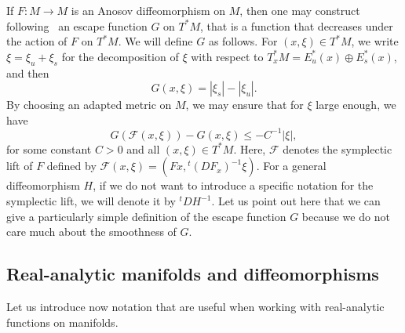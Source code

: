 \documentclass[10pt]{amsart}
\theoremstyle{definition}\newtheorem{defi}[theo]{Definition}\newtheorem{rema}[theo]{Remark}\newtheorem{exam}[theo]{Example}\newtheorem{exem}[theo]{Example}\newtheorem{nota}[theo]{Notation}
\newcommand{\va}[1]{\left|#1\right|}
\newcommand{\clF}{\mathcal{F}}
\begin{document}
If $F : M \to M$ is an Anosov diffeomorphism on $M$, then one may construct following~\cite{faure_roy_sjostrand} an escape function $G$ on $T^* M$, that is a function that decreases under the action of $F$ on $T^* M$. We will define $G$ as follows. For $(x,\xi) \in T^* M$, we write $\xi = \xi_u + \xi_s$ for the decomposition of $\xi$ with respect to $T^*_x M = E_u^*(x) \oplus E_s^*(x)$, and then
\begin{equation}\label{eq:definition_escape_function}
G(x,\xi) = \va{\xi_s} - \va{\xi_u}.
\end{equation}
By choosing an adapted metric on $M$, we may ensure that for $\xi$ large enough, we have
\begin{equation*}
G(\clF(x,\xi)) - G(x,\xi) \leq - C^{-1} \va{\xi},
\end{equation*}
for some constant $C > 0$ and all $(x,\xi) \in T^* M$. Here, $\clF$ denotes the symplectic lift of $F$ defined by $\clF(x,\xi) = (Fx, {}^t (DF_x)^{-1} \xi)$. For a general diffeomorphism $H$, if we do not want to introduce a specific notation for the symplectic lift, we will denote it by ${}^t D H^{-1}$. Let us point out here that we can give a particularly simple definition of the escape function $G$ because we do not care much about the smoothness of $G$.

\subsection{Real-analytic manifolds and diffeomorphisms}\label{subsection:definitions}

Let us introduce now notation that are useful when working with real-analytic functions on manifolds.
\end{document}
